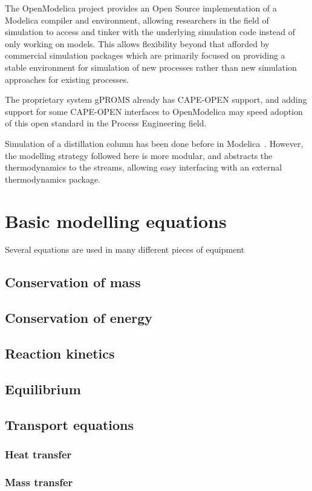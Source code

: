 The OpenModelica project provides an Open Source implementation of a Modelica compiler and environment, allowing researchers in the field of simulation to access and tinker with the underlying simulation code instead of only working on models.  
This allows flexibility beyond that afforded by commercial simulation packages which are primarily focused on providing a stable environment for simulation of new processes rather than new simulation approaches for existing processes.

The proprietary system gPROMS already has CAPE-OPEN support, and adding support for some CAPE-OPEN interfaces to OpenModelica may speed adoption of this open standard in the Process Engineering field.

Simulation of a distillation column has been done before in Modelica~\citep{duro.morilla2003modelling}.
However, the modelling strategy followed here is more modular, and abstracts the thermodynamics to the streams, allowing easy interfacing with an external thermodynamics package.

\section{Basic modelling equations}
Several equations are used in many different pieces of equipment
\subsection{Conservation of mass}
\subsection{Conservation of energy}
\subsection{Reaction kinetics}



\subsection{Equilibrium}
\subsection{Transport equations}
\subsubsection{Heat transfer}
\subsubsection{Mass transfer}

